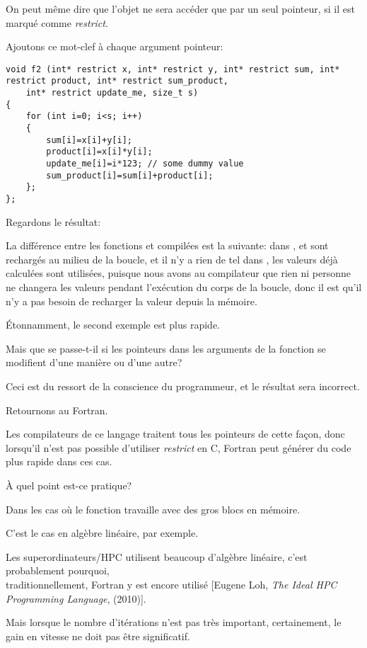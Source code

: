 On peut même dire que l'objet ne sera accéder que par un seul pointeur, si il est
marqué comme \emph{restrict}.

Ajoutons ce mot-clef à chaque argument pointeur:

\begin{lstlisting}[style=customc]
void f2 (int* restrict x, int* restrict y, int* restrict sum, int* restrict product, int* restrict sum_product, 
	int* restrict update_me, size_t s)
{
	for (int i=0; i<s; i++)
	{
		sum[i]=x[i]+y[i];
		product[i]=x[i]*y[i];
		update_me[i]=i*123; // some dummy value
		sum_product[i]=sum[i]+product[i];	
	};
};
\end{lstlisting}

Regardons le résultat:





La différence entre les fonctions  et  compilées est la suivante:
dans ,  et 
sont rechargés au milieu de la boucle, et il n'y a rien de tel dans , les
valeurs déjà calculées sont utilisées, puisque nous avons  au compilateur
que rien ni personne ne changera les valeurs pendant l'exécution du corps de la boucle,
donc il est  qu'il n'y a pas besoin de recharger la valeur depuis la mémoire.

Étonnamment, le second exemple est plus rapide.

Mais que se passe-t-il si les pointeurs dans les arguments de la fonction se
modifient d'une manière ou d'une autre?

Ceci est du ressort de la conscience du programmeur, et le résultat sera incorrect.

Retournons au Fortran.

Les compilateurs de ce langage traitent tous les pointeurs de cette façon, donc lorsqu'il
n'est pas possible d'utiliser \emph{restrict} en C, Fortran peut générer du code plus
rapide dans ces cas.

À quel point est-ce pratique?

Dans les cas où le fonction travaille avec des gros blocs en mémoire.

C'est le cas en algèbre linéaire, par exemple.

Les superordinateurs/\ac{HPC} utilisent beaucoup d'algèbre linéaire, c'est probablement
pourquoi,\\
traditionnellement, Fortran y est encore utilisé [Eugene Loh, \emph{The Ideal HPC Programming Language}, (2010)].

Mais lorsque le nombre d'itérations n'est pas très important, certainement, le gain
en vitesse ne doit pas être significatif.
